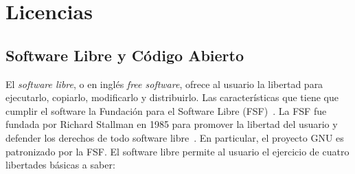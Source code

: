\chapter{Licencias}

\section{Software Libre y Código Abierto}

El \textit{software libre}, o en inglés \textit{free software}, ofrece
al usuario la libertad para ejecutarlo, copiarlo, modificarlo y
distribuirlo. Las características que tiene que cumplir el software
la Fundación para el Software Libre (FSF)~\cite{Etiqueta07}. La FSF
fue fundada por Richard Stallman en 1985 para promover la libertad del
usuario y defender los derechos de todo software
libre~\cite{Etiqueta14}. En particular, el proyecto GNU es patronizado
por la FSF. El software libre permite al usuario el ejercicio de
cuatro libertades básicas a saber:

